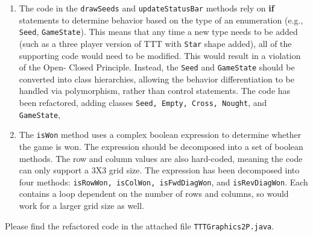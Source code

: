\documentclass{report}
\begin{document}
\begin{enumerate}
\begin{enumerate}
\item The code in the \texttt{drawSeeds} and \texttt{updateStatusBar} methods rely on
\textbf{if} statements to determine behavior based on the type of an enumeration (e.g., \texttt{Seed}, \texttt{GameState}). This means that any time a new type needs to be
added (such as a three player version of TTT with \texttt{Star} shape added), all of the supporting code would need to be modified. This would result in a violation of the Open-
Closed Principle. Instead, the \texttt{Seed} and \texttt{GameState} should be converted
into class hierarchies, allowing the behavior differentiation to be handled via
polymorphism, rather than control statements. The code has been refactored, adding
classes \texttt{Seed, Empty, Cross, Nought}, and \texttt{GameState}, 
 
\item The \texttt{isWon} method uses a complex boolean expression to determine whether
the game
 is won. The expression should be decomposed into a set of boolean methods.
 The row and column values are also hard-coded, meaning the code can only support a 3X3
 grid size. The expression has been decomposed into four methods: \texttt{isRowWon,
 	isColWon, isFwdDiagWon}, and \texttt{isRevDiagWon}. Each contains a loop
 dependent on the number of rows and columns, so would work for a larger grid size as well.
    \end{enumerate}

Please find the refactored code in the attached file \texttt{TTTGraphics2P.java}.

\end{enumerate}
\end{document}
